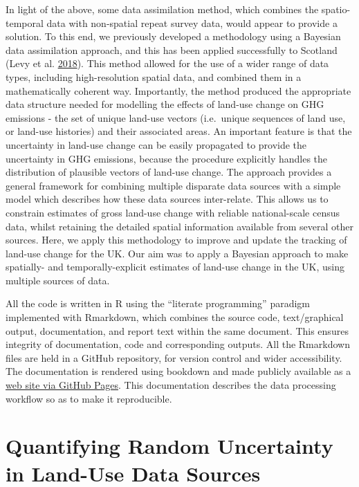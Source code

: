 \documentclass[
]{book}
\begin{document}
In light of the above, some data assimilation method, which combines the spatio-temporal data with non-spatial repeat survey data, would appear to provide a solution. To this end, we previously developed a methodology using a Bayesian data assimilation approach, and this has been applied successfully to Scotland (Levy et al. \protect\hyperlink{ref-Levy2018}{2018}). This method allowed for the use of a wider range of data types, including high-resolution spatial data, and combined them in a mathematically coherent way. Importantly, the method produced the appropriate data structure needed for modelling the effects of land-use change on GHG emissions - the set of unique land-use vectors (i.e.~unique sequences of land use, or land-use histories) and their associated areas. An important feature is that the uncertainty in land-use change can be easily propagated to provide the uncertainty in GHG emissions, because the procedure explicitly handles the distribution of plausible vectors of land-use change.
The approach provides a general framework for combining multiple disparate data sources with a simple model which describes how these data sources inter-relate. This allows us to constrain estimates of gross land-use change with reliable national-scale census data, whilst retaining the detailed spatial information available from several other sources. Here, we apply this methodology to improve and update the tracking of land-use change for the UK. Our aim was to apply a Bayesian approach to make spatially- and temporally-explicit estimates of land-use change in the UK, using multiple sources of data.

All the code is written in R using the ``literate programming'' paradigm implemented with Rmarkdown, which combines the source code, text/graphical output, documentation, and report text within the same document. This ensures integrity of documentation, code and corresponding outputs. All the Rmarkdown files are held in a GitHub repository, for version control and wider accessibility. The documentation is rendered using bookdown and made publicly available as a \href{https://nerc-ceh.github.io/luc_track/}{web site via GitHub Pages}. This documentation describes the data processing workflow so as to make it reproducible.

\hypertarget{quantifying-random-uncertainty-in-land-use-data-sources}{%
\chapter{Quantifying Random Uncertainty in Land-Use Data Sources}\label{quantifying-random-uncertainty-in-land-use-data-sources}}
\end{document}

